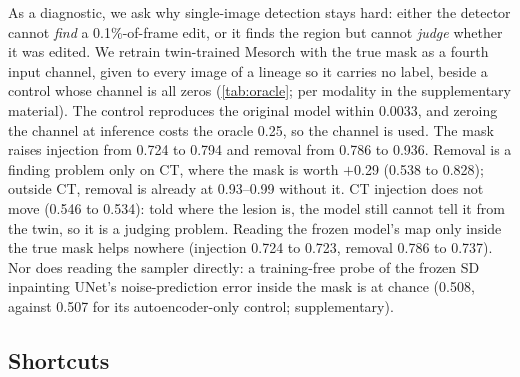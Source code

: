 As a diagnostic, we ask why single-image detection stays hard: either the detector cannot \emph{find} a 0.1\%-of-frame edit, %
or it finds the region but cannot \emph{judge} whether it was edited.
We retrain twin-trained Mesorch with the true mask as a fourth input channel, given to every image of a lineage so it carries no label, beside a control whose channel is all zeros (\cref{tab:oracle}; per modality in the supplementary material).
The control reproduces the original model within 0.0033, %
and zeroing the channel at inference costs the oracle 0.25, so the channel is used. %
The mask raises injection from 0.724 to 0.794 %
and removal from 0.786 to 0.936. %
Removal is a finding problem only on CT, where the mask is worth $+$0.29 (0.538 to 0.828); %
outside CT, removal is already at 0.93--0.99 without it. %
CT injection does not move (0.546 to 0.534): told where the lesion is, the model still cannot tell it from the twin, so it is a judging problem. %
Reading the frozen model's map only inside the true mask helps nowhere (injection 0.724 to 0.723, removal 0.786 to 0.737). %
Nor does reading the sampler directly: a training-free probe of the frozen SD inpainting UNet's noise-prediction error inside the mask is at chance (0.508, against 0.507 for its autoencoder-only control; supplementary). %

\subsection{Shortcuts}
\label{sec:shortcuts}

